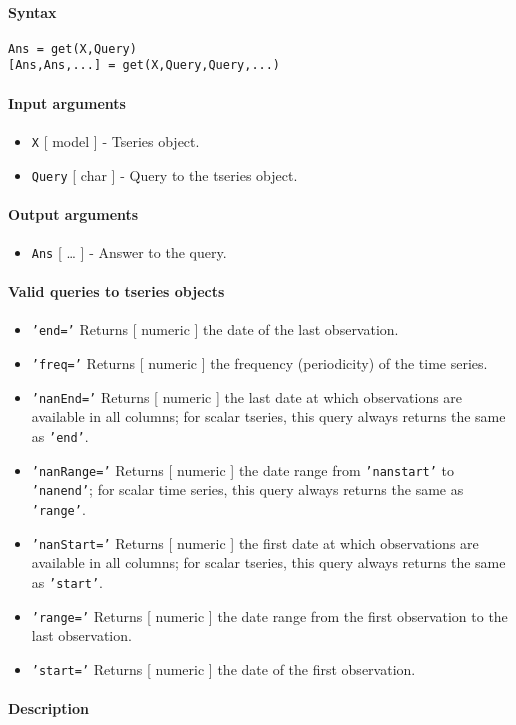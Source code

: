 


	\paragraph{Syntax}

\begin{verbatim}
Ans = get(X,Query)
[Ans,Ans,...] = get(X,Query,Query,...)
\end{verbatim}

\paragraph{Input arguments}

\begin{itemize}
\item
  \texttt{X} {[} model {]} - Tseries object.
\item
  \texttt{Query} {[} char {]} - Query to the tseries object.
\end{itemize}

\paragraph{Output arguments}

\begin{itemize}
\itemsep1pt\parskip0pt
\item
  \texttt{Ans} {[} \ldots{} {]} - Answer to the query.
\end{itemize}

\paragraph{Valid queries to tseries
objects}

\begin{itemize}
\item
  \texttt{'end='} Returns {[} numeric {]} the date of the last
  observation.
\item
  \texttt{'freq='} Returns {[} numeric {]} the frequency (periodicity)
  of the time series.
\item
  \texttt{'nanEnd='} Returns {[} numeric {]} the last date at which
  observations are available in all columns; for scalar tseries, this
  query always returns the same as \texttt{'end'}.
\item
  \texttt{'nanRange='} Returns {[} numeric {]} the date range from
  \texttt{'nanstart'} to \texttt{'nanend'}; for scalar time series, this
  query always returns the same as \texttt{'range'}.
\item
  \texttt{'nanStart='} Returns {[} numeric {]} the first date at which
  observations are available in all columns; for scalar tseries, this
  query always returns the same as \texttt{'start'}.
\item
  \texttt{'range='} Returns {[} numeric {]} the date range from the
  first observation to the last observation.
\item
  \texttt{'start='} Returns {[} numeric {]} the date of the first
  observation.
\end{itemize}

\paragraph{Description}


